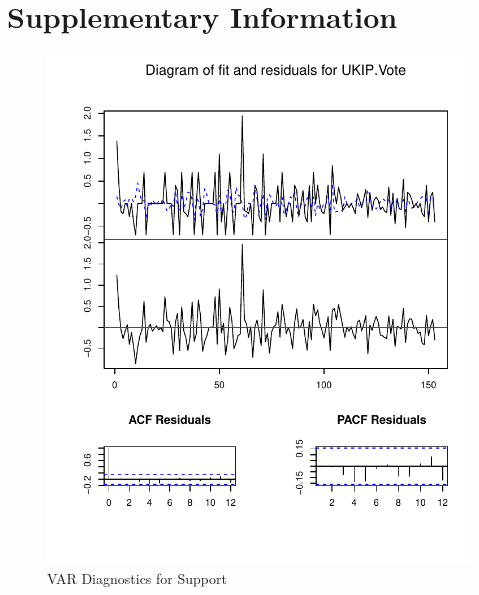 \documentclass[12pt,]{article}
\makeatletter
\def\maxwidth{\ifdim\Gin@nat@width>\linewidth\linewidth
\else\Gin@nat@width\fi}
\let\Oldincludegraphics\includegraphics
\renewcommand{\includegraphics}[1]{\Oldincludegraphics[width=\maxwidth]{#1}}
\makeatother
\begin{document}
\newpage

\section{Supplementary Information}\label{supplementary-information}

\begin{figure}[htbp]
\centering
\includegraphics{ukip_media_files/var-plot-support.pdf}
\caption{VAR Diagnostics for Support}
\end{figure}

\pagebreak
\end{document}
